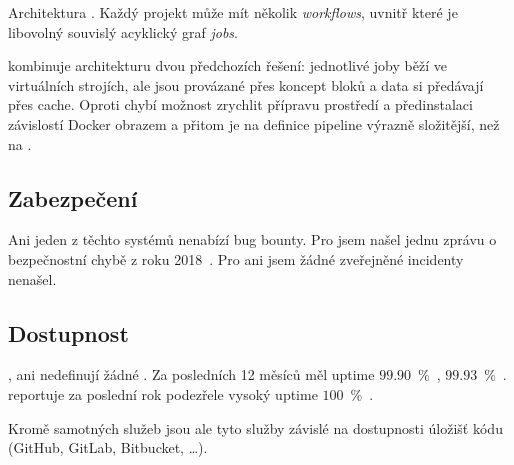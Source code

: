          \begin{iffigure}
            \centering
            \caption{Architektura \circleci. Každý projekt může mít několik \textit{workflows}, uvnitř které je libovolný souvislý acyklický graf \textit{jobs}.}
            \label{pic:circle-architecture}
        \end{iffigure}

        \semaphore kombinuje architekturu dvou předchozích řešení: jednotlivé joby běží ve virtuálních strojích, ale jsou provázané přes koncept bloků a data si předávají přes cache. Oproti \circleci chybí možnost zrychlit přípravu prostředí a předinstalaci závislostí Docker obrazem a přitom je na \semaphore definice pipeline výrazně složitější, než na \travis.

    \subsection{Zabezpečení}
        Ani jeden z těchto  \CI systémů nenabízí bug bounty. Pro \travis jsem našel jednu zprávu o bezpečnostní chybě z roku 2018~\cite{travis-db-drop}. Pro \circleci ani \semaphore jsem žádné zveřejněné incidenty nenašel.

    \subsection{Dostupnost}
        \circleci, \travis ani \semaphore nedefinují žádné . Za posledních 12 měsíců měl \circleci uptime $99.90$~\%~\cite{circle-uptime}, \travis $99.93$~\%~\cite{travis-uptime}. \semaphore reportuje za poslední rok podezřele vysoký uptime $100$~\%~\cite{semaphore-uptime}.

        Kromě samotných \CI služeb jsou ale tyto služby závislé na dostupnosti úložišť kódu (GitHub, GitLab, Bitbucket, …).

